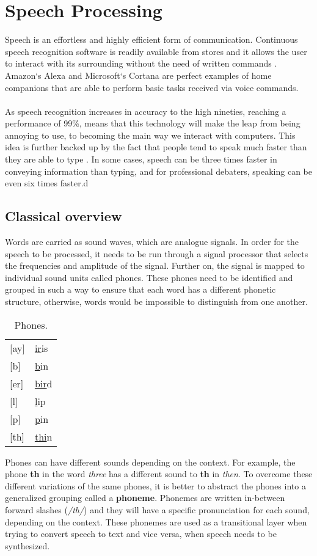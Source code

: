 \chapter{Speech Processing}\label{ch:speech_processing}
Speech is an effortless and highly efficient form of communication.
Continuous speech recognition software is readily available from stores and it allows the user to interact with its surrounding without the need of written commands
\cite[p.~396]{callan2003artificial}. Amazon`s Alexa 
\cite{Alexa} and Microsoft`s Cortana 
\cite{Cortana} are perfect examples of home companions that are able to perform basic tasks received via voice commands.\\\\
As speech recognition increases in accuracy to the high nineties, reaching a performance of 99\%,  means that this technology will make the leap from being annoying to use, to becoming the main way we interact with computers. 
This idea is further backed up by the fact that people tend to speak much faster than they are able to type \cite{Speed}.
In some cases, speech can be three times faster in conveying information than typing, and for professional debaters,
speaking can be even six times faster.d

\section{Classical overview}
Words are carried as sound waves, which are analogue signals.
In order for the speech to be processed,
it needs to be run through a signal processor that selects the frequencies and amplitude of the signal.
Further on, the signal is mapped to individual sound units called phones.
These phones need to be identified and grouped in such a way to ensure that each word has a different phonetic structure,
otherwise, words would be impossible to distinguish from one another.
\begin{table}[H]
\centering
	\caption{Phones.}
	\label{my-label}
	\begin{tabular}{l l}
		{[}ay{]} & \underline{ir}is \\
		{[}b{]}  & \underline{b}in  \\
		{[}er{]} & \underline{bir}d \\
		{[}l{]}  & \underline{l}ip  \\
		{[}p{]}  & \underline{p}in  \\
		{[}th{]} & \underline{thi}n
	\end{tabular}
\end{table}
Phones can have different sounds depending on the context. 
For example, the phone \textbf{th} in the word \textit{three} has a different sound to \textbf{th} in \textit{then}. 
To overcome these different variations of the same phones, 
it is better to abstract the phones into a generalized grouping called a \textbf{phoneme}.
Phonemes are written in-between forward slashes
(\textit{/th/}) and they will have a specific pronunciation for each sound, depending on the context.
These phonemes are used as a transitional layer when trying to convert speech to text and vice versa,
when speech needs to be synthesized.

